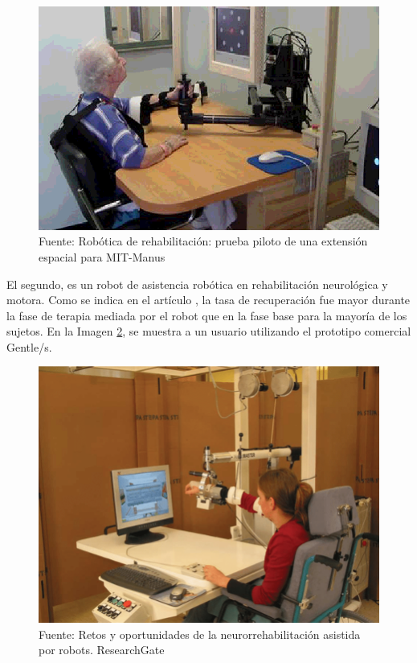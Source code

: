 \begin{figure}[ht!]
	\centering
	\begin{minipage}{0.55\linewidth}
		\centering
		\includegraphics[width=\linewidth]{figs/mit_manus.png}
	\end{minipage}
	\caption[Terapia asistida por el robot MIT-MANUS]{Fuente: Robótica de rehabilitación: prueba piloto de una extensión espacial para MIT-Manus}
	\label{fig:mitmanus}
\end{figure}

El segundo, es un robot de asistencia robótica en rehabilitación neurológica y motora.
Como se indica en el artículo \cite{perales3c}, la tasa de recuperación fue mayor durante la fase de terapia mediada por el robot que en la fase base para la mayoría de los sujetos.
En la Imagen \ref{fig:gentles}, se muestra a un usuario utilizando el prototipo comercial Gentle/s.\\

\begin{figure}[ht!]
	\centering
	\begin{minipage}{0.55\linewidth}
		\centering
		\includegraphics[width=\linewidth]{figs/gentles.png}
	\end{minipage}
	\caption[Prototipo comercial del robot rehabilitador Gentle/s]{Fuente: Retos y oportunidades de la neurorrehabilitación asistida por robots. ResearchGate}
	\label{fig:gentles}
\end{figure}

